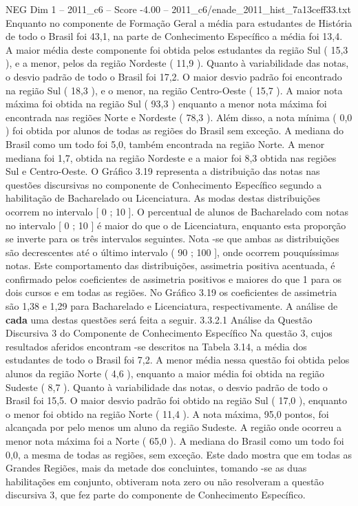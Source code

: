 \begin{textsample}{NEG Dim 1 – 2011\_c6 – Score -4.00 – 2011\_c6/enade\_2011\_hist\_7a13ceff33.txt}
Enquanto no componente de Formação Geral a média para estudantes de História de todo o Brasil foi 43,1, na parte de Conhecimento Específico a média foi 13,4.
A maior média deste componente foi obtida pelos estudantes da região Sul ( 15,3 ), e a menor, pelos da região Nordeste ( 11,9 ).
Quanto à variabilidade das notas, o desvio padrão de todo o Brasil foi 17,2.
O maior desvio padrão foi encontrado na região Sul ( 18,3 ), e o menor, na região Centro-Oeste ( 15,7 ).
A maior nota máxima foi obtida na região Sul ( 93,3 ) enquanto a menor nota máxima foi encontrada nas regiões Norte e Nordeste ( 78,3 ).
Além disso, a nota mínima ( 0,0 ) foi obtida por alunos de todas as regiões do Brasil sem exceção.
A mediana do Brasil como um todo foi 5,0, também encontrada na região Norte.
A menor mediana foi 1,7, obtida na região Nordeste e a maior foi 8,3 obtida nas regiões Sul e Centro-Oeste.
O Gráfico 3.19 representa a distribuição das notas nas questões discursivas no componente de Conhecimento Específico segundo a habilitação de Bacharelado ou Licenciatura.
As modas destas distribuições ocorrem no intervalo [ 0 ; 10 ].
O percentual de alunos de Bacharelado com notas no intervalo [ 0 ; 10 ] é maior do que o de Licenciatura, enquanto esta proporção se inverte para os três intervalos seguintes.
Nota -se que ambas as distribuições são decrescentes até o último intervalo ( 90 ; 100 ], onde ocorrem pouquíssimas notas.
Este comportamento das distribuições, assimetria positiva acentuada, é confirmado pelos coeficientes de assimetria positivos e maiores do que 1 para os dois cursos e em todas as regiões.
No Gráfico 3.19 os coeficientes de assimetria são 1,38 e 1,29 para Bacharelado e Licenciatura, respectivamente.
A análise de \textbf{cada} uma destas questões será feita a seguir. 3.3.2.1 Análise da Questão Discursiva 3 do Componente de Conhecimento Específico Na questão 3, cujos resultados aferidos encontram -se descritos na Tabela 3.14, a média dos estudantes de todo o Brasil foi 7,2.
A menor média nessa questão foi obtida pelos alunos da região Norte ( 4,6 ), enquanto a maior média foi obtida na região Sudeste ( 8,7 ).
Quanto à variabilidade das notas, o desvio padrão de todo o Brasil foi 15,5.
O maior desvio padrão foi obtido na região Sul ( 17,0 ), enquanto o menor foi obtido na região Norte ( 11,4 ).
A nota máxima, 95,0 pontos, foi alcançada por pelo menos um aluno da região Sudeste.
A região onde ocorreu a menor nota máxima foi a Norte ( 65,0 ).
A mediana do Brasil como um todo foi 0,0, a mesma de todas as regiões, sem exceção.
Este dado mostra que em todas as Grandes Regiões, mais da metade dos concluintes, tomando -se as duas habilitações em conjunto, obtiveram nota zero ou não resolveram a questão discursiva 3, que fez parte do componente de Conhecimento Específico.

\end{textsample}

